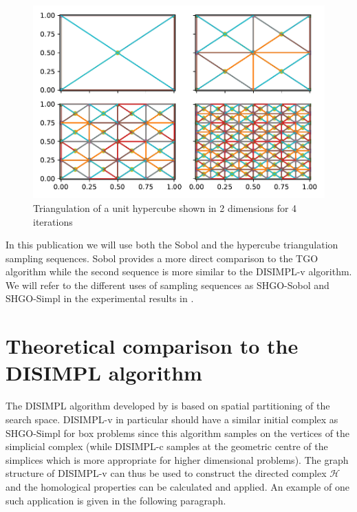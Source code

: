 \begin{figure}
\centerline{\includegraphics[scale=1.0]{./Fig10.pdf}}
{\caption{Triangulation of a unit hypercube shown in 2 dimensions for 4 iterations  \label{fig:triangles} }}
\end{figure}

In this publication we will use both the Sobol and the hypercube triangulation sampling sequences. Sobol provides a more direct comparison to the TGO algorithm while the second sequence is more similar to the DISIMPL-v algorithm. We will refer to the different uses of sampling sequences as SHGO-Sobol and SHGO-Simpl in the experimental results in .

\section{Theoretical comparison to the DISIMPL algorithm}
The DISIMPL algorithm developed by \citeauthor{Paul2014b} \cite{Paul2014b, paulavivcius2014simplicial, Paul2014a} is based on spatial partitioning of the search space. DISIMPL-v in particular should have a similar initial complex as SHGO-Simpl for box problems since this algorithm samples on the vertices of the simplicial complex (while DISIMPL-c samples at the geometric centre of the simplices which is more appropriate for higher dimensional problems). The graph structure of DISIMPL-v can thus be used to construct the directed complex $\mathcal{H}$ and the homological properties can be calculated and applied. An example of one such application is given in the following paragraph.

